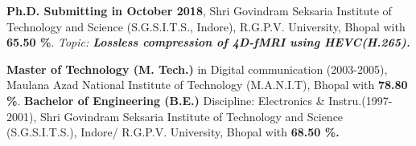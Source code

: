 %
%
%


\begin{scholarship}
					{\textbf{\textbf{Ph.D. Submitting in October 2018}}, Shri Govindram Seksaria Institute of Technology and Science (S.G.S.I.T.S., Indore), R.G.P.V. University, Bhopal with \textbf{65.50 \%}. \textit{\textit{{Topic: \textbf{\textbf{Lossless compression of 4D-fMRI using HEVC(H.265).}}}}}}
					
					{\textbf{Master of Technology (M. Tech.)}
					in Digital communication (2003-2005), 
					Maulana Azad National Institute of Technology (M.A.N.I.T), Bhopal with
					\textbf{78.80 \%}.}
					{\textbf{Bachelor of Engineering (B.E.)}
					Discipline: Electronics \& Instru.(1997-2001), Shri Govindram Seksaria Institute of Technology and Science (S.G.S.I.T.S.), Indore/ R.G.P.V. University, Bhopal with \textbf{68.50 \%.}
					}
\end{scholarship}